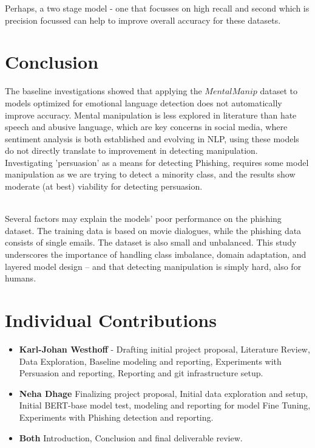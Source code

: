\documentclass[
	letterpaper, %
	12pt, %
	unnumberedsections, %
	twoside, %
]{LTJournalArticle}
\begin{document}
Perhaps, a two stage model - one that focusses on high recall and second which is precision focussed can help to improve overall accuracy for these datasets.


\section{Conclusion}

The baseline investigations showed that applying the $MentalManip$ dataset to models optimized for emotional language detection does not automatically improve accuracy. Mental manipulation is less explored in literature than hate speech and abusive language, which are key concerns in social media, where sentiment analysis is both established and evolving in NLP, using these models do not directly translate to improvement in detecting manipulation. \\
Investigating 'persuasion' as a means for detecting Phishing, requires some model manipulation as we are trying to detect a minority class, and the results show moderate (at best) viability for detecting persuasion.

\\
Several factors may explain the models’ poor performance on the phishing dataset. The training data is based on movie dialogues, while the phishing data consists of single emails. The dataset is also small and unbalanced. This study underscores the importance of handling class imbalance, domain adaptation, and layered model design -- and that detecting manipulation is simply hard, also for humans.

\clearpage
\onecolumn
\printbibliography %


\clearpage
\onecolumn
\section*{Individual Contributions}


\begin{itemize}
	\item \textbf{Karl-Johan Westhoff} - Drafting initial project proposal, Literature Review, Data Exploration, Baseline modeling and reporting, Experiments with Persuasion and reporting, Reporting and git infrastructure setup.
	\item \textbf{Neha Dhage} Finalizing project proposal, Initial data exploration and setup, Initial BERT-base model test, modeling and reporting for model Fine Tuning, Experiments with Phishing detection and reporting.
	\item \textbf{Both} Introduction, Conclusion and final deliverable review.
\end{itemize}
\end{document}
